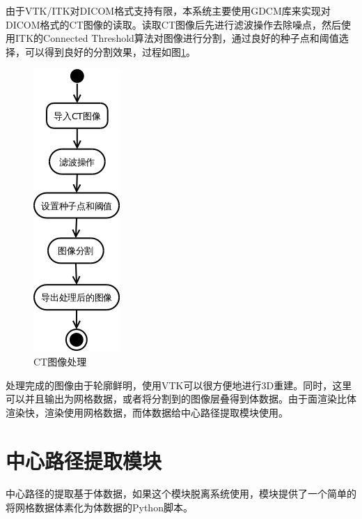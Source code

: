 由于VTK/ITK对DICOM格式支持有限，本系统主要使用GDCM库来实现对DICOM格式的CT图像的读取。读取CT图像后先进行滤波操作去除噪点，然后使用ITK的Connected Threshold算法对图像进行分割，通过良好的种子点和阈值选择，可以得到良好的分割效果，过程如图\ref{ct-process}。
\begin{figure}[h!]
    \centering
    \includegraphics[width=100bp]{figure/ct_process.png}
    \caption{CT图像处理}
    \label{ct-process}
\end{figure}

处理完成的图像由于轮廓鲜明，使用VTK可以很方便地进行3D重建。同时，这里可以并且输出为网格数据，或者将分割到的图像层叠得到体数据。由于面渲染比体渲染快，渲染使用网格数据，而体数据给中心路径提取模块使用。

\section{中心路径提取模块}
中心路径的提取基于体数据，如果这个模块脱离系统使用，模块提供了一个简单的将网格数据体素化为体数据的Python脚本。

